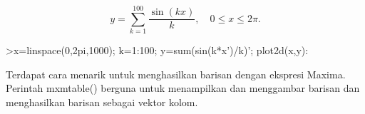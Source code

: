 \documentclass[a4paper,10pt]{article}
\begin{document}
\begin{eulernotebook}
\begin{eulercomment}
\begin{eulercomment}
\begin{eulercomment}
\begin{eulercomment}
\begin{eulercomment}
\begin{eulercomment}
\begin{eulercomment}
\begin{eulercomment}
\begin{eulercomment}
\begin{eulercomment}
\begin{eulercomment}
\begin{eulercomment}
\begin{eulercomment}
\begin{eulercomment}
\begin{eulercomment}
\begin{eulercomment}
\begin{eulercomment}
\begin{eulercomment}
\begin{eulercomment}
\begin{eulercomment}
\begin{eulercomment}
\begin{eulercomment}
\begin{eulercomment}
\begin{eulercomment}
\begin{eulercomment}
\end{eulercomment}
\begin{eulerformula}
\[
y = \sum_{k=1}^{100} \dfrac{\sin(kx)}{k},\quad 0\le x\le 2\pi.
\]
\end{eulerformula}
\begin{eulercomment}
\end{eulercomment}
\begin{eulerprompt}
>x=linspace(0,2pi,1000); k=1:100; y=sum(sin(k*x')/k)'; plot2d(x,y):
\end{eulerprompt}
\begin{eulercomment}
Terdapat cara menarik untuk menghasilkan barisan dengan ekspresi
Maxima. Perintah mxmtable() berguna untuk menampilkan dan menggambar
barisan dan menghasilkan barisan sebagai vektor kolom.


\end{eulercomment}
\end{eulercomment}
\end{eulercomment}
\end{eulercomment}
\end{eulercomment}
\end{eulercomment}
\end{eulercomment}
\end{eulercomment}
\end{eulercomment}
\end{eulercomment}
\end{eulercomment}
\end{eulercomment}
\end{eulercomment}
\end{eulercomment}
\end{eulercomment}
\end{eulercomment}
\end{eulercomment}
\end{eulercomment}
\end{eulercomment}
\end{eulercomment}
\end{eulercomment}
\end{eulercomment}
\end{eulercomment}
\end{eulercomment}
\end{eulercomment}
\end{eulernotebook}
\end{document}
